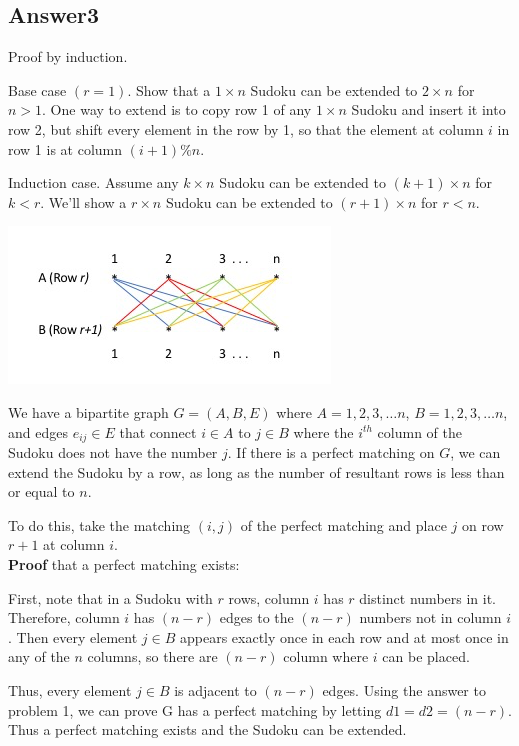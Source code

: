 \documentclass[twoside]{article}
\begin{document}
\subsection{Answer3}
Proof by induction.

Base case $(r=1)$. Show that a $1 \times n$ Sudoku can be extended to $2 \times n$ for $n > 1$.
One way to extend is to copy row 1 of any $1 \times n$ Sudoku and insert it into row 2, but shift every element in the row by 1, so that the element at column $i$ in row 1 is at column $(i + 1) \% n$. 

Induction case. Assume any $k \times n$ Sudoku can be extended to $(k+1) \times n$ for $k < r$. We'll show a $r \times n$ Sudoku can be extended to $(r+1) \times n $ for $r < n$.

\includegraphics{SudokuFigure1}
 
We have a bipartite graph $G=(A, B, E)$ where $A={1, 2 , 3, \ldots n}$, $B={1, 2, 3, \ldots n}$, and edges $e_{ij} \in E$ that connect $i \in A$ to $j \in B$ where the $i^{th}$ column of the Sudoku does not have the number $j$. If there is a perfect matching on $G$, we can extend the Sudoku by a row, as long as the number of resultant rows is less than or equal to $n$. 

To do this, take the matching $(i,j)$ of the perfect matching and place $j$ on row $r+1$ at column $i$.\\[12pt]

\textbf{Proof} that a perfect matching exists:

First, note that in a Sudoku with $r$ rows, column $i$ has $r$ distinct numbers in it. Therefore, column $i$ has $(n - r)$ edges to the $(n - r)$ numbers not in column $i$. Then every element $j \in B$ appears exactly once in each row and at most once in any of the $n$ columns, so there are $(n - r)$ column where $i$ can be placed. 

Thus, every element $j \in B$ is adjacent to $(n - r)$ edges.
Using the answer to problem 1, we can prove G has a perfect matching by letting  $d1=d2= (n-r)$. Thus a perfect matching exists and the Sudoku can be extended.
\end{document}
